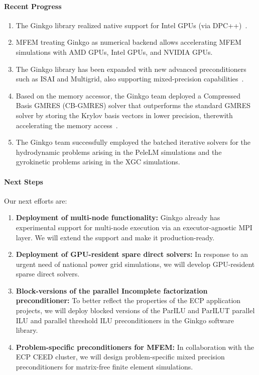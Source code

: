 \paragraph{Recent Progress}
\begin{enumerate}
  \item The Ginkgo library realized native support for Intel GPUs (via
		DPC++)~\cite{tsai2021porting}.
  \item MFEM treating Ginkgo as numerical backend allows accelerating MFEM
		simulations with AMD GPUs, Intel GPUs, and NVIDIA GPUs.
  \item The Ginkgo library has been expanded with new advanced preconditioners
		such as ISAI and Multigrid, also supporting mixed-precision capabilities~\cite{10.1007/978-3-030-85665-6_34}.
  \item Based on the memory accessor, the Ginkgo team deployed a Compressed
		Basis GMRES (CB-GMRES) solver that outperforms the standard GMRES solver
		by storing the Krylov basis vectors in lower precision, therewith
		accelerating the memory access~\cite{DBLP:journals/corr/abs-2009-12101}.
  \item The Ginkgo team successfully employed the batched iterative solvers for
		the hydrodynamic problems arising in the PeleLM
		simulations and the gyrokinetic problems arising in the
		XGC simulations.
\end{enumerate}


\paragraph{Next Steps}
Our next efforts are:
\begin{enumerate}
  \item \textbf{Deployment of multi-node functionality:} Ginkgo already has
		experimental support for multi-node execution via an executor-agnostic
		MPI layer. We will extend the support and make it production-ready.
  \item \textbf{Deployment of GPU-resident spare direct solvers:} In response to
		an urgent need of national power grid simulations, we will develop
		GPU-resident sparse direct solvers.
  \item \textbf{Block-versions of the parallel Incomplete factorization
		preconditioner:} To better reflect the properties of the ECP application
		projects, we will deploy blocked versions of the ParILU and ParILUT
		parallel ILU and parallel threshold ILU preconditioners in the Ginkgo
		software library.
  \item \textbf{Problem-specific preconditioners for MFEM:} In collaboration
		with the ECP CEED cluster, we will design problem-specific mixed
		precision preconditioners for matrix-free finite element simulations.
\end{enumerate}


